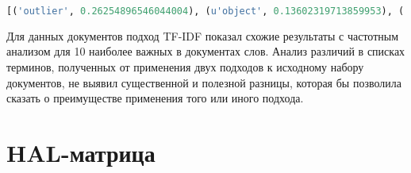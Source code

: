 \documentclass[12pt, a4paper] {article}
\begin{document}
\begin{lstlisting}[language=Python,caption=Результат выполнения алгоритма tf-idf,label=data:tfidf]
[('outlier', 0.26254896546044004), (u'object', 0.13602319713859953), ('data', 0.11392813120541295), ('detection', 0.1013210616302909), (u'method', 0.0734720193079806), ('normal', 0.048627730510549506), (u'cluster', 0.04734489541089902), ('set', 0.039061073556141586), ('model', 0.03799268609733297), ('may', 0.0367360096539903), ('point', 0.030225830727966703), ('contextual', 0.029890572054802587), ('example', 0.026040715704094393), (u'attribute', 0.022045138846600615), ('distance', 0.020830890570316337), ('density', 0.020012988062170035), ('using', 0.019530536778070793), ('used', 0.019065523997640537), ('collective', 0.018878256034612163), ('distribution', 0.018600511217210278), ('two', 0.017670485656349766), ('detect', 0.01692388461208486), ('many', 0.016740460095489254), ('small', 0.016275447315058995), ('number', 0.016275447315058995), ('context', 0.016096597258880806), ('one', 0.01581043453462874), ('statistical', 0.015345421754198481), ('application', 0.015345421754198481), ('cell', 0.014989726370703732)]
\end{lstlisting}

Для данных документов подход TF-IDF показал схожие результаты с частотным анализом для 10 наиболее важных в документах слов. Анализ различий в списках терминов, полученных от применения двух подходов к исходному набору документов, не выявил существенной и полезной разницы, которая бы позволила сказать о преимуществе применения того или иного подхода.

\section{HAL-матрица}
\end{document}
